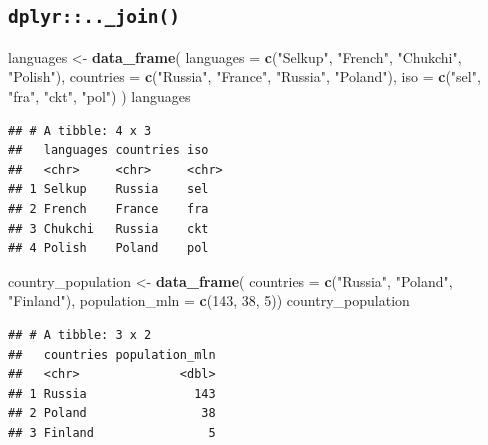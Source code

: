 \documentclass[]{book}
\newenvironment{Shaded}{\begin{snugshade}}{\end{snugshade}}
\newcommand{\DataTypeTok}[1]{\textcolor[rgb]{0.13,0.29,0.53}{#1}}
\newcommand{\DecValTok}[1]{\textcolor[rgb]{0.00,0.00,0.81}{#1}}
\newcommand{\KeywordTok}[1]{\textcolor[rgb]{0.13,0.29,0.53}{\textbf{#1}}}
\newcommand{\NormalTok}[1]{#1}
\newcommand{\StringTok}[1]{\textcolor[rgb]{0.31,0.60,0.02}{#1}}
\begin{document}
\hypertarget{dplyr.._join}{%
\subsection{\texorpdfstring{\texttt{dplyr::..\_join()}}{dplyr::..\_join()}}\label{dplyr.._join}}

\begin{Shaded}
\begin{Highlighting}[]
\NormalTok{languages <-}\StringTok{ }\KeywordTok{data_frame}\NormalTok{(}
  \DataTypeTok{languages =} \KeywordTok{c}\NormalTok{(}\StringTok{"Selkup"}\NormalTok{, }\StringTok{"French"}\NormalTok{, }\StringTok{"Chukchi"}\NormalTok{, }\StringTok{"Polish"}\NormalTok{),}
  \DataTypeTok{countries =} \KeywordTok{c}\NormalTok{(}\StringTok{"Russia"}\NormalTok{, }\StringTok{"France"}\NormalTok{, }\StringTok{"Russia"}\NormalTok{, }\StringTok{"Poland"}\NormalTok{),}
  \DataTypeTok{iso =} \KeywordTok{c}\NormalTok{(}\StringTok{"sel"}\NormalTok{, }\StringTok{"fra"}\NormalTok{, }\StringTok{"ckt"}\NormalTok{, }\StringTok{"pol"}\NormalTok{)}
\NormalTok{  )}
\NormalTok{languages}
\end{Highlighting}
\end{Shaded}

\begin{verbatim}
## # A tibble: 4 x 3
##   languages countries iso  
##   <chr>     <chr>     <chr>
## 1 Selkup    Russia    sel  
## 2 French    France    fra  
## 3 Chukchi   Russia    ckt  
## 4 Polish    Poland    pol
\end{verbatim}

\begin{Shaded}
\begin{Highlighting}[]
\NormalTok{country_population <-}\StringTok{ }\KeywordTok{data_frame}\NormalTok{(}
  \DataTypeTok{countries =} \KeywordTok{c}\NormalTok{(}\StringTok{"Russia"}\NormalTok{, }\StringTok{"Poland"}\NormalTok{, }\StringTok{"Finland"}\NormalTok{),}
  \DataTypeTok{population_mln =} \KeywordTok{c}\NormalTok{(}\DecValTok{143}\NormalTok{, }\DecValTok{38}\NormalTok{, }\DecValTok{5}\NormalTok{))}
\NormalTok{country_population}
\end{Highlighting}
\end{Shaded}

\begin{verbatim}
## # A tibble: 3 x 2
##   countries population_mln
##   <chr>              <dbl>
## 1 Russia               143
## 2 Poland                38
## 3 Finland                5
\end{verbatim}
\end{document}

